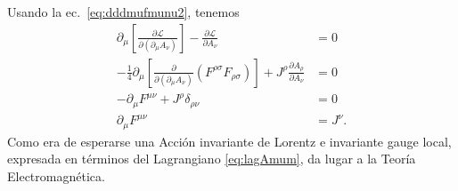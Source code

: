 \begin{frame}
Usando la ec.~\eqref{eq:dddmufmunu2}, tenemos
\begin{align}
\label{eq:177qft}
  \partial_\mu\left[
    \frac{\partial\mathcal{L}}{\partial(\partial_\mu A_\nu)}  
  \right]-\frac{\partial\mathcal{L}}{\partial A_\nu}&=0\nonumber\\
  -\frac{1}{4}\partial_\mu\left[
    \frac{\partial}{\partial(\partial_\mu A_\nu)}(F^{\rho\sigma}F_{\rho\sigma})  
  \right]+J^\rho\frac{\partial A_\rho}{\partial A_\nu}&=0\nonumber\\
  -\partial_\mu F^{\mu\nu}+J^\rho\delta_{\rho\nu}&=0\nonumber\\
  \partial_\mu F^{\mu\nu}&=J^\nu.
\end{align}
Como era de esperarse una Acción invariante de Lorentz e invariante
gauge local, expresada en términos del Lagrangiano \eqref{eq:lagAmum},
da lugar a la Teoría Electromagnética. 
\end{frame}
 
